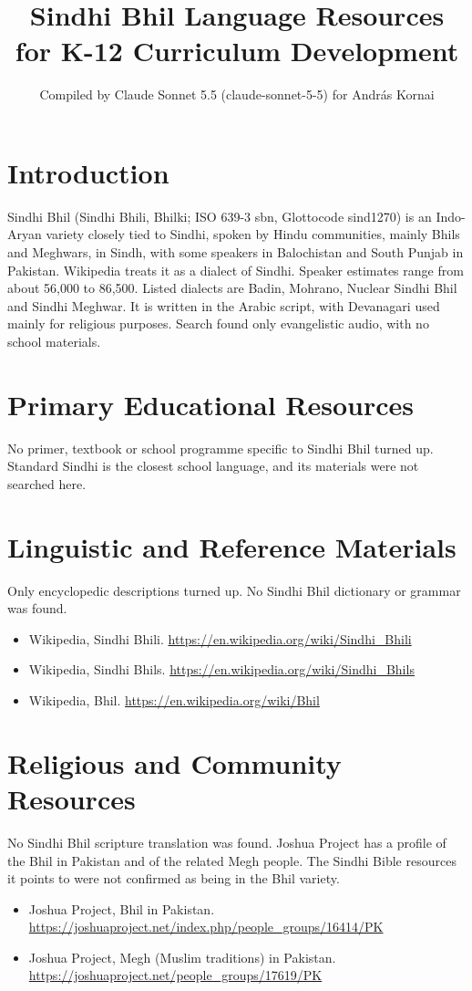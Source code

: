 \documentclass[12pt]{article}
\title{Sindhi Bhil Language Resources for K-12 Curriculum Development}
\author{Compiled by Claude Sonnet 5.5 (claude-sonnet-5-5) for Andr\'as Kornai}
\date{}
\begin{document}
\maketitle

\section{Introduction}
Sindhi Bhil (Sindhi Bhili, Bhilki; ISO 639-3 sbn, Glottocode sind1270) is an Indo-Aryan variety closely tied to Sindhi, spoken by Hindu communities, mainly Bhils and Meghwars, in Sindh, with some speakers in Balochistan and South Punjab in Pakistan. Wikipedia treats it as a dialect of Sindhi. Speaker estimates range from about 56,000 to 86,500. Listed dialects are Badin, Mohrano, Nuclear Sindhi Bhil and Sindhi Meghwar. It is written in the Arabic script, with Devanagari used mainly for religious purposes. Search found only evangelistic audio, with no school materials.

\section{Primary Educational Resources}
No primer, textbook or school programme specific to Sindhi Bhil turned up. Standard Sindhi is the closest school language, and its materials were not searched here.

\section{Linguistic and Reference Materials}
Only encyclopedic descriptions turned up. No Sindhi Bhil dictionary or grammar was found.
\begin{itemize}
\item Wikipedia, Sindhi Bhili. \url{https://en.wikipedia.org/wiki/Sindhi_Bhili}
\item Wikipedia, Sindhi Bhils. \url{https://en.wikipedia.org/wiki/Sindhi_Bhils}
\item Wikipedia, Bhil. \url{https://en.wikipedia.org/wiki/Bhil}
\end{itemize}

\section{Religious and Community Resources}
No Sindhi Bhil scripture translation was found. Joshua Project has a profile of the Bhil in Pakistan and of the related Megh people. The Sindhi Bible resources it points to were not confirmed as being in the Bhil variety.
\begin{itemize}
\item Joshua Project, Bhil in Pakistan. \url{https://joshuaproject.net/index.php/people_groups/16414/PK}
\item Joshua Project, Megh (Muslim traditions) in Pakistan. \url{https://joshuaproject.net/people_groups/17619/PK}
\end{itemize}
\end{document}

